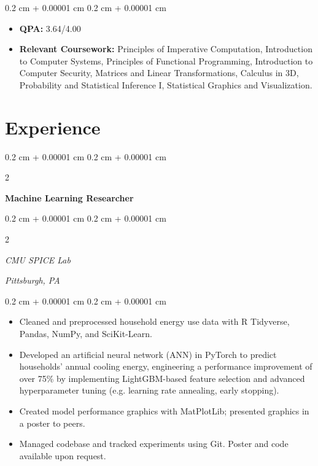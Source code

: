\documentclass[10pt, letterpaper]{article}
\newenvironment{highlights}{
    \begin{itemize}[
        topsep=0.10 cm,
        parsep=0.10 cm,
        partopsep=0pt,
        itemsep=0pt,
        leftmargin=0.4 cm + 10pt
    ]
}{
    \end{itemize}
} %
\newenvironment{onecolentry}{
    \begin{adjustwidth}{
        0.2 cm + 0.00001 cm
    }{
        0.2 cm + 0.00001 cm
    }
}{
    \end{adjustwidth}
} %
\newenvironment{twocolentry}[2][]{
    \onecolentry
    \def\secondColumn{#2}
    \setcolumnwidth{\fill, 4.5 cm}
    \begin{paracol}{2}
}{
    \switchcolumn \raggedleft \secondColumn
    \end{paracol}
    \endonecolentry
} %
\begin{document}
        \vspace{0.10 cm}
        \begin{onecolentry}
            \begin{highlights}
                \item \textbf{QPA:} 3.64/4.00 
                \item \textbf{Relevant Coursework:} Principles of Imperative Computation, Introduction to Computer Systems, Principles of Functional Programming, Introduction to Computer Security, Matrices and Linear Transformations, Calculus in 3D, Probability and Statistical Inference I, Statistical Graphics and Visualization.
            \end{highlights}
        \end{onecolentry}
    
    \section{Experience}

        \begin{twocolentry}{
        }
            \textbf{Machine Learning Researcher}
        \end{twocolentry}
        \begin{twocolentry}{
            \textit{Pittsburgh, PA}}
        \textit{CMU SPICE Lab}
        \end{twocolentry}

        \vspace{0.10 cm}
        \begin{onecolentry}
            \begin{highlights}
                \item Cleaned and preprocessed household energy use data with R Tidyverse, Pandas, NumPy, and SciKit-Learn.
                \item Developed an artificial neural network (ANN) in PyTorch to predict households' annual cooling energy, engineering a performance improvement of over 75\% by implementing LightGBM-based feature selection and advanced hyperparameter tuning (e.g. learning rate annealing, early stopping).
                \item Created model performance graphics with MatPlotLib; presented graphics in a poster to peers.
                \item Managed codebase and tracked experiments using Git. Poster and code available upon request.
            \end{highlights}
        \end{onecolentry}
\end{document}
